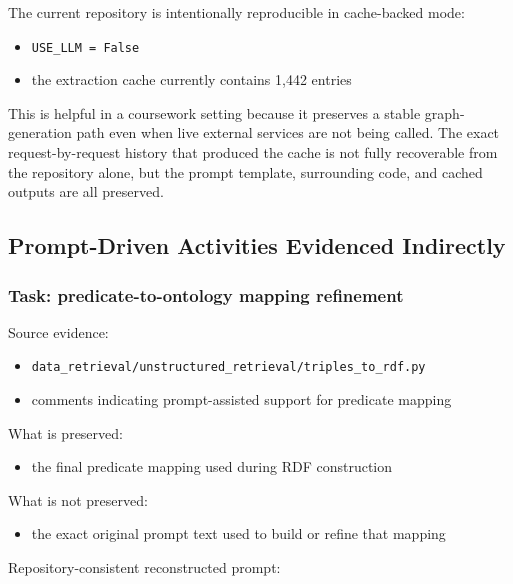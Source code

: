 \documentclass[
  11pt,
  a4paper,
]{article}
\providecommand{\tightlist}{%
  \setlength{\itemsep}{0pt}\setlength{\parskip}{0pt}}
\begin{document}
The current repository is intentionally reproducible in cache-backed
mode:

\begin{itemize}
\tightlist
\item
  \texttt{USE\_LLM\ =\ False}
\item
  the extraction cache currently contains 1,442 entries
\end{itemize}

This is helpful in a coursework setting because it preserves a stable
graph-generation path even when live external services are not being
called. The exact request-by-request history that produced the cache is
not fully recoverable from the repository alone, but the prompt
template, surrounding code, and cached outputs are all preserved.

\subsection{Prompt-Driven Activities Evidenced
Indirectly}\label{prompt-driven-activities-evidenced-indirectly}

\subsubsection{Task: predicate-to-ontology mapping
refinement}\label{task-predicate-to-ontology-mapping-refinement}

Source evidence:

\begin{itemize}
\tightlist
\item
  \texttt{data\_retrieval/unstructured\_retrieval/triples\_to\_rdf.py}
\item
  comments indicating prompt-assisted support for predicate mapping
\end{itemize}

What is preserved:

\begin{itemize}
\tightlist
\item
  the final predicate mapping used during RDF construction
\end{itemize}

What is not preserved:

\begin{itemize}
\tightlist
\item
  the exact original prompt text used to build or refine that mapping
\end{itemize}

Repository-consistent reconstructed prompt:
\end{document}
